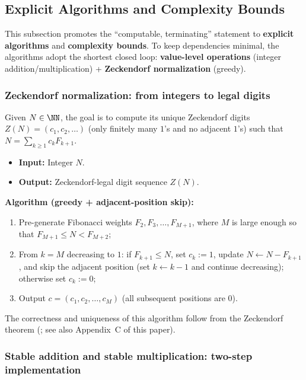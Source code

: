 \subsection{Explicit Algorithms and Complexity Bounds}\label{subsec:zeckendorf-algorithms-complexity}

This subsection promotes the ``computable, terminating'' statement to \textbf{explicit algorithms} and \textbf{complexity bounds}. To keep dependencies minimal, the algorithms adopt the shortest closed loop: \textbf{value-level operations} (integer addition/multiplication) + \textbf{Zeckendorf normalization} (greedy).

\subsubsection{Zeckendorf normalization: from integers to legal digits}

Given $N\in\NN$, the goal is to compute its unique Zeckendorf digits $Z(N)=(c_1,c_2,\dots)$ (only finitely many $1$'s and no adjacent $1$'s) such that $N=\sum_{k\ge 1}c_kF_{k+1}$.

\begin{itemize}
  \item \textbf{Input:} Integer $N$.
  \item \textbf{Output:} Zeckendorf-legal digit sequence $Z(N)$.
\end{itemize}

\textbf{Algorithm (greedy + adjacent-position skip):}
\begin{enumerate}
  \item Pre-generate Fibonacci weights $F_{2},F_{3},\dots,F_{M+1}$, where $M$ is large enough so that $F_{M+1}\le N<F_{M+2}$;
  \item From $k=M$ decreasing to $1$: if $F_{k+1}\le N$, set $c_k:=1$, update $N\leftarrow N-F_{k+1}$, and skip the adjacent position (set $k\leftarrow k-1$ and continue decreasing); otherwise set $c_k:=0$;
  \item Output $c=(c_1,c_2,\dots,c_M)$ (all subsequent positions are $0$).
\end{enumerate}

The correctness and uniqueness of this algorithm follow from the Zeckendorf theorem (\cite{Zeckendorf1972}; see also Appendix~C of this paper).

\subsubsection{Stable addition and stable multiplication: two-step implementation}

